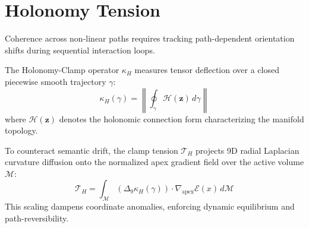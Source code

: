 \section{Holonomy Tension}
\label{sec:holonomy-tension}

Coherence across non-linear
paths requires tracking
path-dependent orientation
shifts during sequential
interaction loops.

The Holonomy-Clamp operator
$\mathcal{\kappa}_H$ measures
tensor deflection over a closed
piecewise smooth trajectory $\gamma$:
\[
\mathcal{\kappa}_H(\gamma)
= \left\| \oint_{\gamma}
\mathcal{H}(\mathbf{z}) \,
d\gamma \right\|
\]
where $\mathcal{H}(\mathbf{z})$
denotes the holonomic connection form
characterizing the manifold topology.

To counteract semantic drift,
the clamp tension $\mathcal{T}_H$
projects 9D radial Laplacian
curvature diffusion onto the
normalized apex gradient field
over the active volume $\mathcal{M}$:
\[
\mathcal{T}_H
= \int_{\mathcal{M}}
\left( \Delta_9
\mathcal{\kappa}_H(\gamma)
\right) \cdot
\nabla_{\mathrm{apex}}
\mathcal{E}(x) \, d\mathcal{M}
\]
This scaling dampens coordinate
anomalies, enforcing dynamic
equilibrium and path-reversibility.
